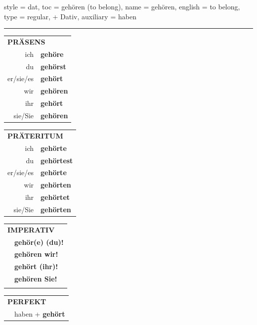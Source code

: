 \begin{verbentry}{
  style = {dat},
  toc = {gehören (to belong)},
  name = {gehören},
  english = {to belong},
  type = {regular, + Dativ},
  auxiliary = {haben}
}
 
    
     \vspace{5pt}

    \hrule
    
    \vspace{5pt}

  \begin{tabular}{rl}
     \multicolumn{2}{l}{\textbf{PRÄSENS} }\\
    ich & \textbf{gehöre}\\
    du & \textbf{gehörst}\\
    er/sie/es & \textbf{gehört}\\
    wir & \textbf{gehören}\\
    ihr & \textbf{gehört}\\
    sie/Sie & \textbf{gehören}\\
  \end{tabular}
  \hfill
     \begin{tabular}{rl}
    \multicolumn{2}{l}{\textbf{PRÄTERITUM} }\\
    ich & \textbf{gehörte}\\
    du & \textbf{gehörtest}\\
    er/sie/es & \textbf{gehörte}\\
    wir & \textbf{gehörten}\\
    ihr & \textbf{gehörtet}\\
    sie/Sie & \textbf{gehörten}\\
  \end{tabular}
  \hfill
  \begin{tabular}{rl}
     \multicolumn{2}{l}{\textbf{IMPERATIV} }\\
   & \textbf{gehör(e) (du)!}\\
   & \textbf{gehören wir!}\\
   & \textbf{gehört (ihr)!}\\
   & \textbf{gehören Sie!}\\
   & \vspace{10pt}
  \end{tabular}

    \vspace{10pt}

 \begin{tabular}{rl}
     \multicolumn{2}{l}{\textbf{PERFEKT}}\\
  &  haben + \textbf{gehört}\\
  \end{tabular}
\hfill
   \begin{tabular}{rl}
   

\end{tabular}
\end{verbentry}
